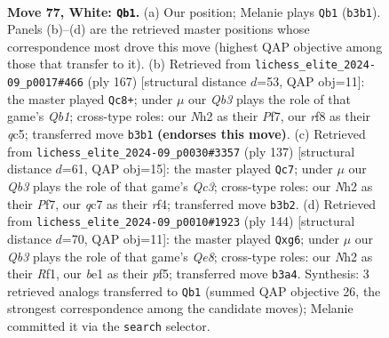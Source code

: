 \documentclass[11pt]{article}
\begin{document}
\clearpage

\begin{figure}[p]\centering
\begin{subfigure}{0.46\textwidth}\centering
\resizebox{\linewidth}{!}{%
\newchessgame
\chessboard[
  setfen={2k2r1r/p1q3p1/7p/7P/3P2P1/1Q2P3/7N/4b2K w - - 3 77},
  showmover=false,
  pgfstyle=straightmove, color=movearrow, markmove={b3-b1}
]}
\caption{}
\end{subfigure}\hfill
\begin{subfigure}{0.46\textwidth}\centering
\resizebox{\linewidth}{!}{%
\newchessgame
\chessboard[
  setfen={1q4k1/5pp1/2K4p/2Q5/p7/P5P1/1P3R1P/1b6 b - - 38 84},
  showmover=false,
  pgfstyle=straightmove, color=movearrow, markmove={b8-c8}
]}
\caption{}
\end{subfigure}
\\[4pt]
\begin{subfigure}{0.46\textwidth}\centering
\resizebox{\linewidth}{!}{%
\newchessgame
\chessboard[
  setfen={8/5pk1/2q3p1/7p/5R1P/1p4P1/1P2R2K/8 b - - 21 69},
  showmover=false,
  pgfstyle=straightmove, color=movearrow, markmove={c6-c7}
]}
\caption{}
\end{subfigure}\hfill
\begin{subfigure}{0.46\textwidth}\centering
\resizebox{\linewidth}{!}{%
\newchessgame
\chessboard[
  setfen={4Q3/1kp5/6p1/5p1p/2q4P/pr4P1/5P2/5RK1 w - - 0 73},
  showmover=false,
  pgfstyle=straightmove, color=movearrow, markmove={e8-g6}
]}
\caption{}
\end{subfigure}
\caption{\textbf{Move 77, White: \texttt{Qb1}.} (a) Our position; Melanie plays \texttt{Qb1} (\texttt{b3b1}). Panels (b)--(d) are the retrieved master positions whose correspondence most drove this move (highest QAP objective among those that transfer to it). (b) Retrieved from \texttt{lichess\_elite\_2024-09\_p0017\#466} (ply 167) [structural distance $d$=53, QAP obj=11]: the master played \texttt{Qc8+}; under $\mu$ our \emph{Qb3} plays the role of that game's \emph{Qb1}; cross-type roles: our \emph{N}h2 as their \emph{P}f7, our \emph{r}f8 as their \emph{q}c5; transferred move \texttt{b3b1} \textbf{(endorses this move)}. (c) Retrieved from \texttt{lichess\_elite\_2024-09\_p0030\#3357} (ply 137) [structural distance $d$=61, QAP obj=15]: the master played \texttt{Qc7}; under $\mu$ our \emph{Qb3} plays the role of that game's \emph{Qc3}; cross-type roles: our \emph{N}h2 as their \emph{P}f7, our \emph{q}c7 as their \emph{r}f4; transferred move \texttt{b3b2}. (d) Retrieved from \texttt{lichess\_elite\_2024-09\_p0010\#1923} (ply 144) [structural distance $d$=70, QAP obj=11]: the master played \texttt{Qxg6}; under $\mu$ our \emph{Qb3} plays the role of that game's \emph{Qe8}; cross-type roles: our \emph{N}h2 as their \emph{R}f1, our \emph{b}e1 as their \emph{p}f5; transferred move \texttt{b3a4}. Synthesis: 3 retrieved analogs transferred to \texttt{Qb1} (summed QAP objective 26, the strongest correspondence among the candidate moves); Melanie committed it via the \texttt{search} selector.}
\label{fig:thought-m152}
\end{figure}
\end{document}
